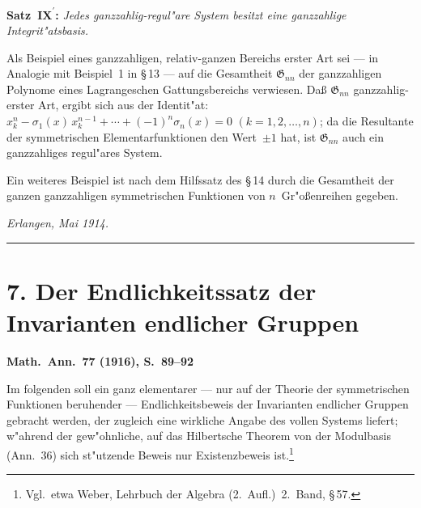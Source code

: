 \documentclass[11pt,a4paper]{article}
\begin{document}
\medskip
\noindent
\textbf{Satz~$\mathbf{IX}^{\boldsymbol{\prime}}$:} \emph{Jedes ganzzahlig-regul"{a}re System besitzt eine
ganzzahlige Integrit"{a}tsbasis.}

Als Beispiel eines ganzzahligen, relativ-ganzen Bereichs erster Art sei
--- in Analogie mit Beispiel~1 in \S\,13 --- auf die Gesamtheit $\mathfrak{G}_{nn}$
der ganzzahligen Polynome eines Lagrangeschen Gattungsbereichs verwiesen.
Da\ss{} $\mathfrak{G}_{nn}$ ganzzahlig-erster Art, ergibt sich aus der Identit"{a}t:
$x_{k}^{n}-\sigma_{1}(x)\,x_{k}^{n-1}+\cdots+(-1)^{n}\sigma_{n}(x)=0$
$(k=1,2,\dots,n)$;
da die Resultante der symmetrischen Elementarfunktionen den Wert~$\pm 1$
hat, ist $\mathfrak{G}_{nn}$ auch ein ganzzahliges regul"{a}res System.

Ein weiteres Beispiel ist nach dem Hilfssatz des \S\,14 durch die
Gesamtheit der ganzen ganzzahligen symmetrischen Funktionen von $n$~Gr"{o}\ss{}enreihen
gegeben.

\medskip
\noindent
\textit{Erlangen, Mai 1914.}

\bigskip
\hrule
\bigskip

\section*{7. Der Endlichkeitssatz der Invarianten endlicher Gruppen}

\textbf{Math.\ Ann.\ 77 (1916), S.\ 89--92}

\smallskip
\noindent
Im folgenden soll ein ganz elementarer --- nur auf der Theorie der
symmetrischen Funktionen beruhender --- Endlichkeitsbeweis der Invarianten
endlicher Gruppen gebracht werden, der zugleich eine wirkliche Angabe
des vollen Systems liefert; w"{a}hrend der gew"{o}hnliche, auf das Hilbertsche
Theorem von der Modulbasis (Ann.\ 36) sich st"{u}tzende Beweis nur
Existenzbeweis ist.\footnote{Vgl.\ etwa Weber, Lehrbuch der Algebra (2.\ Aufl.)\ 2.\ Band, \S\,57.}
\end{document}
